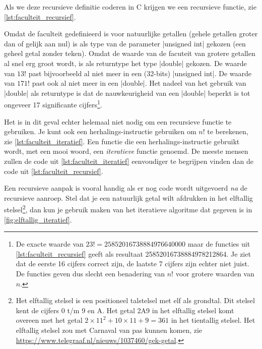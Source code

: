 Als we deze recursieve definitie coderen in C krijgen we een recursieve functie, zie \cref{lst:faculteit_recursief}.


Omdat de faculteit gedefinieerd is voor natuurlijke getallen (gehele getallen groter dan of gelijk aan nul) is als type van de parameter |unsigned int| gekozen (een geheel getal zonder teken).
Omdat de waarde van de facuteit van grotere getallen al snel erg groot wordt, is als returntype het type |double| gekozen. De waarde van $13!$ past bijvoorbeeld al niet meer in een (32-bits) |unsigned int|. De waarde van $171!$ past ook al niet meer in een |double|. Het nadeel van het gebruik van |double| als returntype is dat de nauwkeurigheid van een |double| beperkt is tot ongeveer 17 significante cijfers\footnote{%
	De exacte waarde van $23! = 25852016738884976640000$ maar de functies uit \cref{lst:faculteit_recursief} geeft als resultaat 25852016738884978212864. Je ziet dat de eerste 16 cijfers correct zijn, de laatste 7 cijfers zijn echter niet juist. De functies geven dus slecht een benadering van $n!$ voor grotere waarden van $n$.  
}.

Het is in dit geval echter helemaal niet nodig om een recursieve functie te gebruiken.
Je kunt ook  een herhalings-instructie gebruiken om $n!$ te berekenen, zie \cref{lst:faculteit_iteratief}. Een functie die een herhalings-instructie gebruikt wordt, met een mooi woord, een \emph{iteratieve} functie genoemd. 
De meeste mensen zullen de code uit \cref{lst:faculteit_iteratief} eenvoudiger te begrijpen vinden dan de code uit \cref{lst:faculteit_recursief}. 


Een recursieve aanpak is vooral handig als er nog code wordt uitgevoerd \emph{na} de recursieve aanroep.
Stel dat je een natuurlijk getal wilt afdrukken in het elftallig stelsel\footnote{%
	Het elftallig stelsel is een positioneel talstelsel met elf als grondtal. Dit stelsel kent de cijfers 0 t/m 9 en A. Het getal 2A9 in het elftallig stelsel komt overeen met het getal $2 \times{} 11^2 + 10 \times{} 11 + 9 = 361$ in het tientallig stelsel. Het elftallig stelsel zou met Carnaval van pas kunnen komen, zie \url{https://www.telegraaf.nl/nieuws/1037460/gek-getal}.
}, dan kun je gebruik maken van het iteratieve algoritme dat gegeven is in \cref{fig:elftallig_iteratief}.

